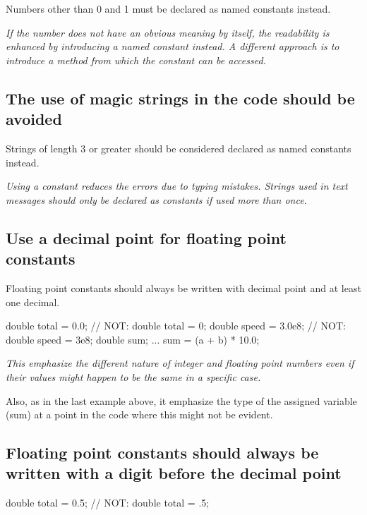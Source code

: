 \documentclass[a4paper,11pt,oneside]{scrbook}
\newcommand{\guideline}[1]{{\subsection{#1}}}
\newcommand{\motivation}[1]{{\normalfont \itshape #1}}
\begin{document}
Numbers other than 0 and 1 must be declared as named constants instead.

\motivation{
  If the number does not have an obvious meaning by itself, the
  readability is enhanced by introducing a named constant instead. A
  different approach is to introduce a method from which the constant
  can be accessed.
}

\guideline{The use of magic strings in the code should be avoided}

Strings of length 3 or greater should be considered declared as named
constants instead.

\motivation{
  Using a constant reduces the errors due to typing mistakes. Strings used in
  text messages should only be declared as constants if used more than once.
}

\guideline{Use a decimal point for floating point constants}

Floating point constants should always be written with decimal point
and at least one decimal.

\begin{code}
  double total = 0.0;     // NOT: double total = 0; 
  double speed = 3.0e8;   // NOT: double speed = 3e8;
  double sum;
  ...
  sum = (a + b) * 10.0; 
\end{code}

\motivation{
  This emphasize the different nature of integer and floating point
  numbers even if their values might happen to be the same in a specific
  case.
}

Also, as in the last example above, it emphasize the type of the
assigned variable (sum) at a point in the code where this might not be
evident.

\guideline{Floating point constants should always be written with a digit before the decimal point}

\begin{code}
  double total = 0.5;             // NOT: double total = .5; 
\end{code}
\end{document}
